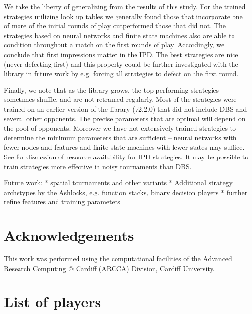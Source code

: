 \documentclass{article}
\begin{document}
We take the liberty of generalizing from the results of this study. For the trained
strategies utilizing look up tables we generally found those that incorporate
one of more of the initial rounds of play outperformed those that did not. The
strategies based on neural networks and finite state machines also are able to
condition throughout a match on the first rounds of play. Accordingly, we conclude
that first impressions matter in the IPD\@. The best strategies are nice (never
defecting first) and this property could be further investigated with the library
in future work by e.g. forcing all strategies to defect on the first round.


Finally, we note that as the library grows, the top performing strategies
sometimes shuffle, and are not retrained regularly. Most of the strategies were
trained on an earlier version of the library (v2.2.0) that did not include DBS
and several other opponents. The precise parameters that are optimal will depend
on the pool of opponents. Moreover we have not extensively trained strategies to
determine the minimum parameters that are sufficient -- neural networks with
fewer nodes and features and finite state machines with fewer states may suffice.
See \cite{ashlock2013impact} for discussion of resource availability for IPD
strategies. It may be possible to train strategies more effective in noisy tournaments
than DBS.


Future work:
* spatial tournaments and other variants
* Additional strategy archetypes by the Ashlocks, e.g. function stacks, binary
decision players
* further refine features and training parameters


\section*{Acknowledgements}

This work was performed using the computational facilities of the Advanced
Research Computing @ Cardiff (ARCCA) Division, Cardiff University.

\printbibliography

\appendix

\section{List of players}\label{app:list_of_players}

\begin{multicols}{2}
	\begin{enumerate}
		
	\end{enumerate}
\end{multicols}
\end{document}
